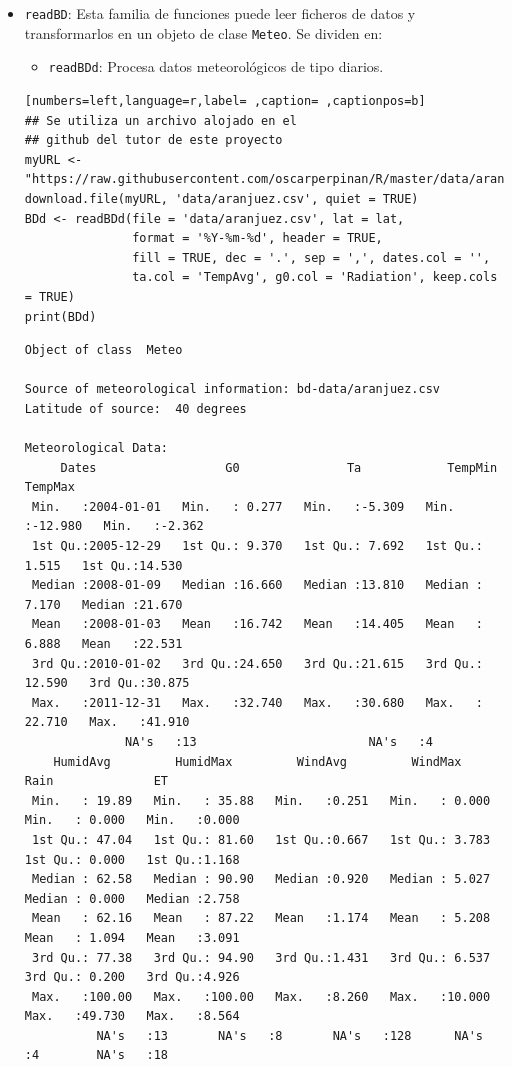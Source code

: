 \begin{itemize}
\item \texttt{readBD}: Esta familia de funciones puede leer ficheros de datos y transformarlos en un objeto de clase \texttt{Meteo}. Se dividen en:
\begin{itemize}
\item \texttt{readBDd}: Procesa datos meteorológicos de tipo diarios.
\end{itemize}
\begin{lstlisting}[numbers=left,language=r,label= ,caption= ,captionpos=b]
## Se utiliza un archivo alojado en el
## github del tutor de este proyecto 
myURL <-"https://raw.githubusercontent.com/oscarperpinan/R/master/data/aranjuez.csv"
download.file(myURL, 'data/aranjuez.csv', quiet = TRUE)
BDd <- readBDd(file = 'data/aranjuez.csv', lat = lat,
               format = '%Y-%m-%d', header = TRUE,
               fill = TRUE, dec = '.', sep = ',', dates.col = '',
               ta.col = 'TempAvg', g0.col = 'Radiation', keep.cols = TRUE)
print(BDd)
\end{lstlisting}

\begin{verbatim}
Object of class  Meteo 

Source of meteorological information: bd-data/aranjuez.csv 
Latitude of source:  40 degrees

Meteorological Data:
     Dates                  G0               Ta            TempMin           TempMax      
 Min.   :2004-01-01   Min.   : 0.277   Min.   :-5.309   Min.   :-12.980   Min.   :-2.362  
 1st Qu.:2005-12-29   1st Qu.: 9.370   1st Qu.: 7.692   1st Qu.:  1.515   1st Qu.:14.530  
 Median :2008-01-09   Median :16.660   Median :13.810   Median :  7.170   Median :21.670  
 Mean   :2008-01-03   Mean   :16.742   Mean   :14.405   Mean   :  6.888   Mean   :22.531  
 3rd Qu.:2010-01-02   3rd Qu.:24.650   3rd Qu.:21.615   3rd Qu.: 12.590   3rd Qu.:30.875  
 Max.   :2011-12-31   Max.   :32.740   Max.   :30.680   Max.   : 22.710   Max.   :41.910  
		      NA's   :13                        NA's   :4                         
    HumidAvg         HumidMax         WindAvg         WindMax            Rain              ET       
 Min.   : 19.89   Min.   : 35.88   Min.   :0.251   Min.   : 0.000   Min.   : 0.000   Min.   :0.000  
 1st Qu.: 47.04   1st Qu.: 81.60   1st Qu.:0.667   1st Qu.: 3.783   1st Qu.: 0.000   1st Qu.:1.168  
 Median : 62.58   Median : 90.90   Median :0.920   Median : 5.027   Median : 0.000   Median :2.758  
 Mean   : 62.16   Mean   : 87.22   Mean   :1.174   Mean   : 5.208   Mean   : 1.094   Mean   :3.091  
 3rd Qu.: 77.38   3rd Qu.: 94.90   3rd Qu.:1.431   3rd Qu.: 6.537   3rd Qu.: 0.200   3rd Qu.:4.926  
 Max.   :100.00   Max.   :100.00   Max.   :8.260   Max.   :10.000   Max.   :49.730   Max.   :8.564  
		  NA's   :13       NA's   :8       NA's   :128      NA's   :4        NA's   :18
\end{verbatim}


\end{itemize}
